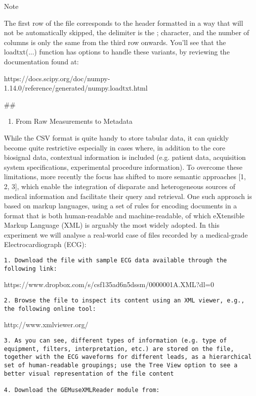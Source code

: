 \documentclass[11pt]{article}
\providecommand{\tightlist}{%
      \setlength{\itemsep}{0pt}\setlength{\parskip}{0pt}}
\begin{document}
    { Note }

The first row of the file corresponds to the header formatted in a way
that will not be automatically skipped, the delimiter is the ;
character, and the number of columns is only the same from the third row
onwards. You'll see that the loadtxt(...) function has options to handle
these variants, by reviewing the documentation found at:

https://docs.scipy.org/doc/numpy-1.14.0/reference/generated/numpy.loadtxt.html

    \#\#

\begin{enumerate}
\def\labelenumi{\arabic{enumi}.}
\setcounter{enumi}{1}
\tightlist
\item
  From Raw Measurements to Metadata
\end{enumerate}

While the CSV format is quite handy to store tabular data, it can
quickly become quite restrictive especially in cases where, in addition
to the core biosignal data, contextual information is included (e.g.
patient data, acquisition system specifications, experimental procedure
information). To overcome these limitations, more recently the focus has
shifted to more semantic approaches {[}1, 2, 3{]}, which enable the
integration of disparate and heterogeneous sources of medical
information and facilitate their query and retrieval. One such approach
is based on markup languages, using a set of rules for encoding
documents in a format that is both human-readable and machine-readable,
of which eXtensible Markup Language (XML) is arguably the most widely
adopted. In this experiment we will analyse a real-world case of files
recorded by a medical-grade Electrocardiograph (ECG):

\begin{verbatim}
1. Download the file with sample ECG data available through the following link:
\end{verbatim}

https://www.dropbox.com/s/csf135ad6n5dssm/0000001A.XML?dl=0

\begin{verbatim}
2. Browse the file to inspect its content using an XML viewer, e.g., the following online tool:
\end{verbatim}

 http://www.xmlviewer.org/

\begin{verbatim}
3. As you can see, different types of information (e.g. type of equipment, filters, interpretation, etc.) are stored on the file, together with the ECG waveforms for different leads, as a hierarchical set of human-readable groupings; use the Tree View option to see a better visual representation of the file content

4. Download the GEMuseXMLReader module from:
\end{verbatim}
\end{document}
